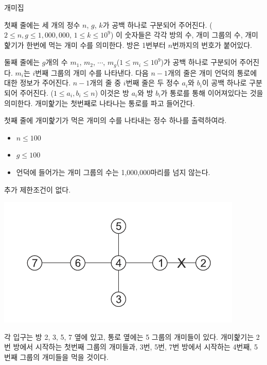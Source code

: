 \begin{problem}{개미집}
	
	\InputFile
	
	첫째 줄에는 세 개의 정수 $n$, $g$, $k$가 공백 하나로 구분되어 주어진다. ($2 \le n,g \le 1,000,000$, $1 \le k \le 10^9$) 이 숫자들은 각각 방의 수, 개미 그룹의 수, 개미핥기가 한번에 먹는 개미 수를 의미한다. 방은 1번부터 $n$번까지의 번호가 붙어있다.
	
	둘째 줄에는 $g$개의 수 $m_1$, $m_2$, $\cdots$, $m_g$($1 \le m_i \le 10^9$)가 공백 하나로 구분되어 주어진다. $m_i$는 $i$번째 그룹의 개미 수를 나타낸다. 다음 $n-1$개의 줄은 개미 언덕의 통로에 대한 정보가 주어진다. $n-1$개의 줄 중 $i$번째 줄은 두 정수 $a_i$와 $b_i$이 공백 하나로 구분되어 주어진다. ($1 \le a_i, b_i \le n$) 이것은 방 $a_i$와 방 $b_i$가 통로를 통해 이어져있다는 것을 의미한다. 개미핥기는 첫번째로 나타나는 통로를 파고 들어간다.
	
	\OutputFile
	첫째 줄에 개미핥기가 먹은 개미의 수를 나타내는 정수 하나를 출력하여라.  
	
	\begin{itemize}
		\item $n \le 100$
		\item $g \le 100$
	\end{itemize}
	
	\begin{itemize}
		\item 언덕에 들어가는 개미 그룹의 수는 1,000,000마리를 넘지 않는다.
	\end{itemize}
	
	
	추가 제한조건이 없다.
	
	\Examples
		
	\begin{example}
	\end{example}
	
	\Note
	\includegraphics[]{mro2.png}
	
	각 입구는 방 2, 3, 5, 7 옆에 있고, 통로 옆에는 5 그룹의 개미들이 있다. 개미핥기는 2번 방에서 시작하는 첫번째 그룹의 개미들과, 3번, 5번, 7번 방에서 시작하는 4번째, 5번째 그룹의 개미들을 먹을 것이다. 
	
\end{problem}

